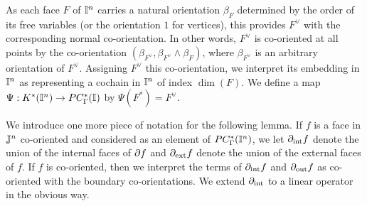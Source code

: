 As each face $F$ of $\mathbb{I}^n$ carries a natural orientation $\beta_F$ determined by the order of its free variables (or the orientation $1$ for vertices), this provides $F^\vee$ with the corresponding normal co-orientation. In other words, $F^\vee$ is co-oriented at all points by the co-orientation $(\beta_{F^\vee},\beta_{F^\vee} \wedge \beta_F)$, where $\beta_{F^\vee}$ is an arbitrary orientation of $F^\vee$. Assigning $F^\vee$ this co-orientation, we interpret its embedding in $\mathbb{I}^n$ as representing a cochain in $\mathbb{I}^n$ of index $\dim(F)$.
We define a map $\Psi: K^*(\mathbb{I}^n) \to PC_\Gamma^*(\mathbb{I})$ by $\Psi(F^*) = F^\vee$.

We introduce one more piece of notation for the following lemma. If $f$ is a face in $\mathbb{J}^n$ co-oriented and considered as an element of $PC^*_\Gamma(\mathbb{I}^n)$, we let $\partial_{\text{int}}f$ denote the union of the internal faces of $\partial f$ and $\partial_{\text{ext}}f$ denote the union of the external faces of $f$. If $f$ is co-oriented, then we interpret the terms of $\partial_{\text{int}}f$ and $\partial_{\text{out}}f$ as co-oriented with the boundary co-orientations. We extend $\partial_{\text{int}}$ to a linear operator in the obvious way.





